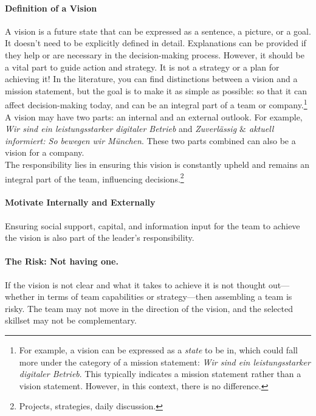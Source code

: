 \paragraph{Definition of a Vision}
A vision is a future state that can be expressed as a sentence, a picture, or a goal.\\

It doesn't need to be explicitly defined in detail. Explanations can be provided if they help or are necessary in the decision-making process. However, it should be a vital part to guide action and strategy.
It is not a strategy or a plan for achieving it! In the literature, you can find distinctions between a vision and a mission statement, but the goal is to make it as simple as possible: so that it can affect decision-making today, and can be an integral part of a team or company.\footnote{
	For example, a vision can be expressed as a \textit{state} to be in, which could fall more under the category of a mission statement: \textit{Wir sind ein leistungsstarker digitaler Betrieb}. This typically indicates a mission statement rather than a vision statement. However, in this context, there is no difference.
}\\

A vision may have two parts: an internal and an external outlook. For example, \textit{Wir sind ein leistungsstarker digitaler Betrieb} and \textit{Zuverlässig $\&$ aktuell informiert: So bewegen wir München}. These two parts combined can also be a vision for a company.\\

The responsibility lies in ensuring this vision is constantly upheld and remains an integral part of the team, influencing decisions.\footnote{
	Projects, strategies, daily discussion.
}


\paragraph{Motivate Internally and Externally}
Ensuring social support, capital, and information input for the team to achieve the vision is also part of the leader's responsibility.

\paragraph{The Risk: Not having one.}
If the vision is not clear and what it takes to achieve it is not thought out—whether in terms of team capabilities or strategy—then assembling a team is risky.
The team may not move in the direction of the vision, and the selected skillset may not be complementary.

